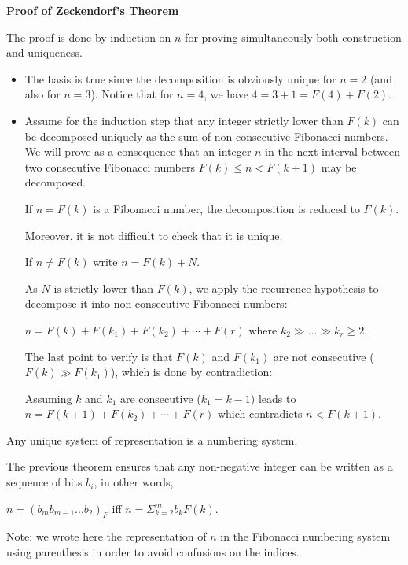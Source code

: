 \noindent \textbf{Proof of Zeckendorf's Theorem}

The proof is done by induction on $n$ for proving simultaneously both construction and uniqueness.

\begin{itemize}
\item
The basis is true since the decomposition is obviously unique for $n=2$ (and also for $n=3$). 
Notice that for $n=4$, we have $4 = 3 + 1 = F(4) + F(2)$. 

\item
Assume for the induction step that any integer strictly lower than $F(k)$ can be decomposed uniquely as the sum of non-consecutive Fibonacci numbers.
We will prove as a consequence that an integer $n$ in the next interval between two consecutive Fibonacci numbers $F(k) \leq n < F(k+1)$ may be decomposed. 

If $n=F(k)$ is a Fibonacci number, the decomposition is reduced to $F(k)$.

Moreover, it is not difficult to check that it is unique.


\medskip

If $n \neq F(k)$ write $n = F(k) + N$.

As $N$ is strictly lower than $F(k)$, we apply the recurrence hypothesis to decompose it into non-consecutive Fibonacci numbers:

$n = F(k) + F(k_1) + F(k_2) + \cdots + F(r)$ where $k_2 \gg ... \gg k_r \geq 2$. 

The last point to verify is that $F(k)$ and $F(k_1)$ are not consecutive ($F(k) \gg F(k_1)$), which is done by contradiction:

Assuming $k$ and $k_1$ are consecutive ($k_1=k-1$) leads to $n = F(k+1) + F(k_2) + \cdots + F(r)$
which contradicts $n < F(k+1)$.
\end{itemize}

Any unique system of representation is a numbering system.

The previous theorem ensures that any non-negative integer can be written
as a sequence of bits $b_i$, in other words,

$n = (b_mb_{m-1}...b_2)_F$ iff $n = \Sigma_{k=2}^m b_k F(k)$.

Note: we wrote here the representation of $n$ in the Fibonacci numbering system using parenthesis in order to avoid confusions 
on the indices.

